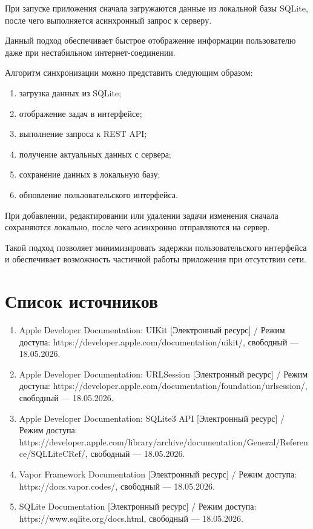 \documentclass[14pt,a4paper]{extarticle}
\begin{document}
При запуске приложения сначала загружаются данные из локальной базы SQLite, после чего выполняется асинхронный запрос к серверу.

Данный подход обеспечивает быстрое отображение информации пользователю даже при нестабильном интернет-соединении.

Алгоритм синхронизации можно представить следующим образом:

\begin{enumerate}
    \item загрузка данных из SQLite;
    \item отображение задач в интерфейсе;
    \item выполнение запроса к REST API;
    \item получение актуальных данных с сервера;
    \item сохранение данных в локальную базу;
    \item обновление пользовательского интерфейса.
\end{enumerate}

При добавлении, редактировании или удалении задачи изменения сначала сохраняются локально, после чего асинхронно отправляются на сервер.

Такой подход позволяет минимизировать задержки пользовательского интерфейса и обеспечивает возможность частичной работы приложения при отсутствии сети.

\newpage
\section{Список источников}

\begin{enumerate}
\item Apple Developer Documentation: UIKit [Электронный ресурс] /
Режим доступа: https://developer.apple.com/documentation/uikit/,
свободный — 18.05.2026.

\item Apple Developer Documentation: URLSession [Электронный ресурс] /
Режим доступа: https://developer.apple.com/documentation/foundation/urlsession/,
свободный — 18.05.2026.

\item Apple Developer Documentation: SQLite3 API [Электронный ресурс] /
Режим доступа: https://developer.apple.com/library/archive/documentation/General/Reference/SQLLiteCRef/,
свободный — 18.05.2026.

\item Vapor Framework Documentation [Электронный ресурс] /
Режим доступа: https://docs.vapor.codes/,
свободный — 18.05.2026.

\item SQLite Documentation [Электронный ресурс] /
Режим доступа: https://www.sqlite.org/docs.html,
свободный — 18.05.2026.
\end{enumerate}
\newpage
\end{document}
